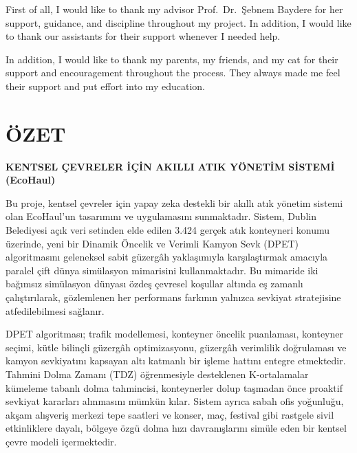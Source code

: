 \documentclass[12pt,a4paper]{report}
\begin{document}
\indent First of all, I would like to thank my advisor Prof.\ Dr.\ \c{S}ebnem Baydere for her support, guidance,
and discipline throughout my project. In addition, I would like to thank our assistants for
their support whenever I needed help.

In addition, I would like to thank my parents, my friends, and my cat for their support and encouragement throughout the process. They always made me feel their support and put effort into my education.



\clearpage

\chapter*{ÖZET}

\begin{center}
{\large\bfseries KENTSEL ÇEVRELER İÇİN AKILLI ATIK YÖNETİM SİSTEMİ (EcoHaul)}
\end{center}
\vspace{0.8cm}

\indent Bu proje, kentsel çevreler için yapay zeka destekli bir akıllı atık yönetim sistemi olan EcoHaul'un tasarımını ve uygulamasını sunmaktadır. Sistem, Dublin Belediyesi açık veri setinden elde edilen 3.424 gerçek atık konteyneri konumu üzerinde, yeni bir Dinamik Öncelik ve Verimli Kamyon Sevk (DPET) algoritmasını geleneksel sabit güzergâh yaklaşımıyla karşılaştırmak amacıyla paralel çift dünya simülasyon mimarisini kullanmaktadır. Bu mimaride iki bağımsız simülasyon dünyası özdeş çevresel koşullar altında eş zamanlı çalıştırılarak, gözlemlenen her performans farkının yalnızca sevkiyat stratejisine atfedilebilmesi sağlanır.

\indent DPET algoritması; trafik modellemesi, konteyner öncelik puanlaması, konteyner seçimi, kütle bilinçli güzergâh optimizasyonu, güzergâh verimlilik doğrulaması ve kamyon sevkiyatını kapsayan altı katmanlı bir işleme hattını entegre etmektedir. Tahmini Dolma Zamanı (TDZ) öğrenmesiyle desteklenen K-ortalamalar kümeleme tabanlı dolma tahmincisi, konteynerler dolup taşmadan önce proaktif sevkiyat kararları alınmasını mümkün kılar. Sistem ayrıca sabah ofis yoğunluğu, akşam alışveriş merkezi tepe saatleri ve konser, maç, festival gibi rastgele sivil etkinliklere dayalı, bölgeye özgü dolma hızı davranışlarını simüle eden bir kentsel çevre modeli içermektedir.
\end{document}
